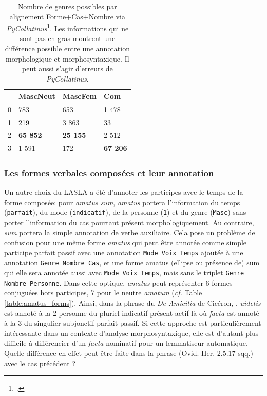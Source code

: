 \begin{table}[h]
\centering
\begin{tabular}{l|lll}
\toprule
         & MascNeut & MascFem & Com    \\ \midrule
0        & 783      & 653     & 1 478  \\
1        & 219      & 3 863   & 33     \\
2        & \textbf{65 852}   & \textbf{25 155}  & 2 512  \\
3        & 1 591    & 172     & \textbf{67 206} \\ \bottomrule
\end{tabular}
\caption{Nombre de genres possibles par alignement Forme+Cas+Nombre via \textit{PyCollatinus}\footcite[\textit{PyCollatinus} est une traduction en python de \textit{Collatinus, cf. }]{thibault_clerice_2018_1243076}. Les informations qui ne sont pas en gras montrent une différence possible entre une annotation morphologique et morphosyntaxique. Il peut aussi s'agir d'erreurs de \textit{PyCollatinus}.}
\label{table:lasla:genders-alignement}
\end{table}

\subsubsection{Les formes verbales composées et leur annotation}

Un autre choix du LASLA a été d'annoter les participes avec le temps de la forme composée: pour \textit{amatus sum}, \textit{amatus} portera l'information du temps (\texttt{parfait}), du mode (\texttt{indicatif}), de la personne (\texttt{1}) et du genre (\texttt{Masc}) sans porter l'information du cas pourtant présent morphologiquement. Au contraire, \textit{sum} portera la simple annotation de verbe auxiliaire. Cela pose un problème de confusion pour une même forme \textit{amatus} qui peut être annotée comme simple participe parfait passif avec une annotation \texttt{Mode Voix Temps} ajoutée à une annotation \texttt{Genre Nombre Cas}, et une forme amatus (ellipse ou présence de) sum qui elle sera annotée aussi avec \texttt{Mode Voix Temps}, mais sans le triplet \texttt{Genre Nombre Personne}. Dans cette optique, \textit{amatus} peut représenter 6 formes conjuguées hors participes, 7 pour le neutre \textit{amatum} (\textit{cf.} Table \ref{table:amatus_forms}). %
%
%
Ainsi, dans la phrase du \textit{De Amicitia} de Cicéron, , \textit{uidetis} est annoté à la 2 personne du pluriel indicatif présent actif là où \textit{facta} est annoté à la 3 du singulier subjonctif parfait passif. Si cette approche est particulièrement intéressante dans un contexte d'analyse morphosyntaxique, elle est d'autant plus difficile à différencier d'un \textit{facta} nominatif pour un lemmatiseur automatique. Quelle différence en effet peut être faite dans la phrase  (Ovid. Her. 2.5.17 sqq.) avec le cas précédent ? %

